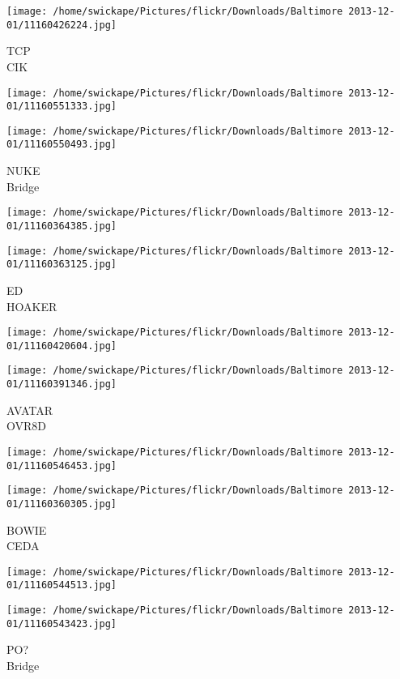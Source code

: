 \documentclass[10pt,letterpaper]{article}
\begin{document}
\vspace{0.25in}
\texttt{[image: /home/swickape/Pictures/flickr/Downloads/Baltimore 2013-12-01/11160426224.jpg]}

TCP\\
CIK
\pagebreak

\texttt{[image: /home/swickape/Pictures/flickr/Downloads/Baltimore 2013-12-01/11160551333.jpg]}

\vspace{0.25in}
\texttt{[image: /home/swickape/Pictures/flickr/Downloads/Baltimore 2013-12-01/11160550493.jpg]}

NUKE\\
Bridge
\pagebreak

\texttt{[image: /home/swickape/Pictures/flickr/Downloads/Baltimore 2013-12-01/11160364385.jpg]}

\vspace{0.25in}
\texttt{[image: /home/swickape/Pictures/flickr/Downloads/Baltimore 2013-12-01/11160363125.jpg]}

ED\\
HOAKER
\pagebreak

\texttt{[image: /home/swickape/Pictures/flickr/Downloads/Baltimore 2013-12-01/11160420604.jpg]}

\vspace{0.25in}
\texttt{[image: /home/swickape/Pictures/flickr/Downloads/Baltimore 2013-12-01/11160391346.jpg]}

AVATAR\\
OVR8D
\pagebreak

\texttt{[image: /home/swickape/Pictures/flickr/Downloads/Baltimore 2013-12-01/11160546453.jpg]}

\vspace{0.25in}
\texttt{[image: /home/swickape/Pictures/flickr/Downloads/Baltimore 2013-12-01/11160360305.jpg]}

BOWIE\\
CEDA
\pagebreak

\texttt{[image: /home/swickape/Pictures/flickr/Downloads/Baltimore 2013-12-01/11160544513.jpg]}

\vspace{0.25in}
\texttt{[image: /home/swickape/Pictures/flickr/Downloads/Baltimore 2013-12-01/11160543423.jpg]}

PO?\\
Bridge
\pagebreak
\end{document}
